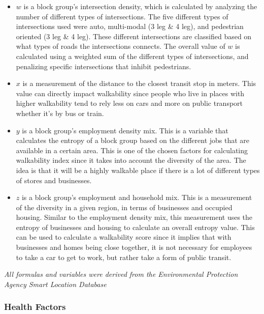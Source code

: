 \documentclass[
]{article}
\begin{document}
\begin{itemize}

\item{ $w$ is a block group's intersection density, which is calculated by analyzing the number of different types of intersections. The five different types of intersections used were auto, multi-modal (3 leg \& 4 leg), and pedestrian oriented (3 leg \& 4 leg). These different intersections are classified based on what types of roads the intersections connects. The overall value of $w$ is calculated using a weighted sum of the different types of intersections, and penalizing specific intersections that inhibit pedestrians.}

\item{$x$ is a measurement of the distance to the closest transit stop in meters. This value can directly impact walkability 
since people who live in places with higher walkability tend to rely less on cars and more on public transport whether it's by bus or train.
}

\item{$y$ is a block group's employment density mix. This is a variable that calculates the entropy of a block group based on the different jobs that are available in a certain area. This is one of the chosen factors for calculating walkability index since it takes into account the diversity of the area. The idea is that it will be a highly walkable place if there is a lot of different types of stores and businesses.}

\item{$z$} is a block group's employment and household mix. This is a measurement of the diversity in a given region, in terms of businesses and occupied housing. Similar to the employment density mix, this measurement uses the entropy of businesses and housing to calculate an overall entropy value. This can be used to calculate a walkability score since it implies that with businesses and homes being close together, it is not necessary for employees to take a car to get to work, but rather take a form of public transit.

\end{itemize}

\emph{All formulas and variables were derived from the Environmental
Protection Agency Smart Location Database}

\subsubsection{Health Factors}\label{health-factors}
\end{document}
